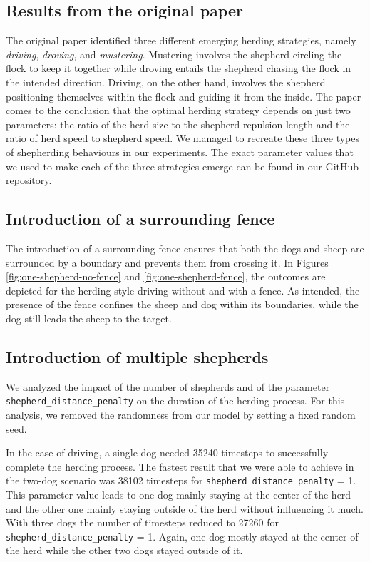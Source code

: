 \subsection{Results from the original paper}

The original paper \cite{ranganathan2022optimal} identified three different emerging herding strategies, namely \textit{driving}, \textit{droving}, and \textit{mustering}. Mustering involves the shepherd circling the flock to keep it together while droving entails the shepherd chasing the flock in the intended direction. Driving, on the other hand, involves the shepherd positioning themselves within the flock and guiding it from the inside. The paper comes to the conclusion that the optimal herding strategy depends on just two parameters: the ratio of the herd size to the shepherd repulsion length and the ratio of herd speed to shepherd speed. We managed to recreate these three types of shepherding behaviours in our experiments. The exact parameter values that we used to make each of the three strategies emerge can be found in our GitHub repository.

\subsection{Introduction of a surrounding fence}
The introduction of a surrounding fence ensures that both the dogs and sheep are surrounded by a boundary and prevents them from crossing it. In Figures \ref{fig:one-shepherd-no-fence} and \ref{fig:one-shepherd-fence}, the outcomes are depicted for the herding style driving without and with a fence. As intended, the presence of the fence confines the sheep and dog within its boundaries, while the dog still leads the sheep to the target.


\subsection{Introduction of multiple shepherds}

We analyzed the impact of the number of shepherds and of the parameter \texttt{shepherd\_distance\_penalty} on the duration of the herding process. For this analysis, we removed the randomness from our model by setting a fixed random seed. 

In the case of driving, a single dog needed 35240 timesteps to successfully complete the herding process. The fastest result that we were able to achieve in the two-dog scenario was 38102 timesteps for \texttt{shepherd\_distance\_penalty} = 1. This parameter value leads to one dog mainly staying at the center of the herd and the other one mainly staying outside of the herd without influencing it much. With three dogs the number of timesteps reduced to 27260 for \texttt{shepherd\_distance\_penalty} = 1. Again, one dog mostly stayed at the center of the herd while the other two dogs stayed outside of it.

